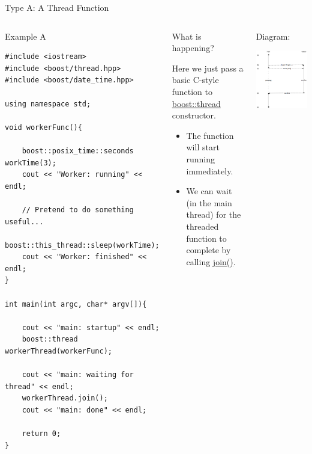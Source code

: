 \documentclass[8pt]{beamer}
\begin{document}
\begin{frame}[fragile]{Type A: A Thread Function}
 
\begin{columns}
 
\begin{exampleblock}{Example A}

\begin{lstlisting}
#include <iostream>
#include <boost/thread.hpp>
#include <boost/date_time.hpp>

using namespace std;

void workerFunc(){

    boost::posix_time::seconds workTime(3);
    cout << "Worker: running" << endl;

    // Pretend to do something useful...
    boost::this_thread::sleep(workTime);
    cout << "Worker: finished" << endl;
}

int main(int argc, char* argv[]){

    cout << "main: startup" << endl;
    boost::thread workerThread(workerFunc);

    cout << "main: waiting for thread" << endl;
    workerThread.join();
    cout << "main: done" << endl;

    return 0;
}
\end{lstlisting}

\end{exampleblock}
 
\begin{block}{What is happening?}

Here we just pass a basic C-style function to \uline{boost::thread} constructor.
\begin{itemize}
  \item The function will start running immediately.
  \item We can wait (in the main thread) for the threaded function to complete by calling \uline{join()}.
\end{itemize}

\end{block}
\begin{block}{Diagram:}
\centering

\includegraphics[width=0.45\linewidth]{img/BoostThreadExample.png}
 

\end{block}
\end{columns}
\end{frame}
\end{document}

